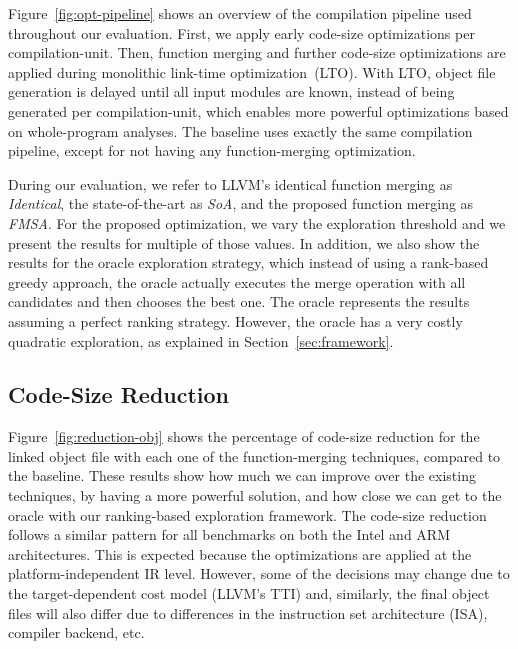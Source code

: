 Figure~\ref{fig:opt-pipeline} shows an overview of the compilation pipeline used
throughout our evaluation.
First, we apply early code-size optimizations per compilation-unit.
Then, function merging and further code-size optimizations are applied during
monolithic link-time optimization~(LTO).
With LTO, object file generation is delayed until all input modules are known,
instead of being generated per compilation-unit, which enables more powerful
optimizations based on whole-program analyses.
The baseline uses exactly the same compilation pipeline, except for not having
any function-merging optimization.

During our evaluation, we refer to LLVM's identical function merging as
\textit{Identical}, the state-of-the-art as \textit{SoA}, and the proposed
function merging as \textit{FMSA}.
For the proposed optimization, we vary the exploration threshold and we present
the results for multiple of those values.
In addition, we also show the results for the oracle exploration strategy,
which instead of using a rank-based greedy approach, the oracle actually
executes the merge operation with all candidates and then chooses the
best one.
The oracle represents the results assuming a perfect ranking strategy.
However, the oracle has a very costly quadratic exploration, as explained in
Section~\ref{sec:framework}.

\subsection{Code-Size Reduction}



Figure~\ref{fig:reduction-obj} shows the
percentage of code-size reduction for the linked object file with each one of
the function-merging techniques, compared to the baseline.
These results show how much we can improve over the existing techniques, by
having a more powerful solution, and how close we can get to the oracle with our
ranking-based exploration framework.
The code-size reduction follows a similar pattern for all benchmarks on both
the Intel and ARM architectures.
This is expected because the optimizations are applied at the
platform-independent IR level.
However, some of the decisions may change due to the target-dependent cost model
(LLVM's TTI) and, similarly, the final object files will also differ due to
differences in the instruction set architecture (ISA), compiler backend, etc.

